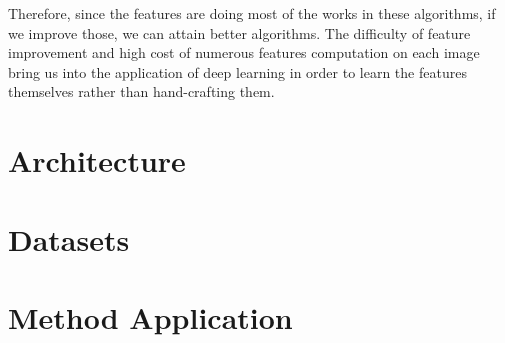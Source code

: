 \indent Therefore, since the features are doing most of the works in these algorithms, if we improve those, we can attain better algorithms. The difficulty of feature improvement and high cost of numerous features computation on each image bring us into the application of deep learning in order to learn the features themselves rather than hand-crafting them. 






\section{Architecture}
\section{Datasets} 


\section{Method Application}



